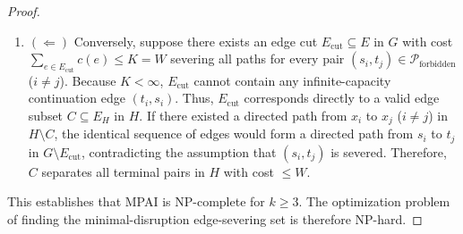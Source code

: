 \begin{proof}
\begin{enumerate}
    \item $(\Leftarrow)$ Conversely, suppose there exists an edge cut $E_{\text{cut}} \subseteq E$ in $G$ with cost $\sum_{e \in E_{\text{cut}}} c(e) \le K = W$ severing all paths for every pair $(s_i, t_j) \in \mathcal{P}_{\text{forbidden}}$ ($i \neq j$). Because $K < \infty$, $E_{\text{cut}}$ cannot contain any infinite-capacity continuation edge $(t_i, s_i)$. Thus, $E_{\text{cut}}$ corresponds directly to a valid edge subset $C \subseteq E_H$ in $H$. If there existed a directed path from $x_i$ to $x_j$ ($i \neq j$) in $H \setminus C$, the identical sequence of edges would form a directed path from $s_i$ to $t_j$ in $G \setminus E_{\text{cut}}$, contradicting the assumption that $(s_i, t_j)$ is severed. Therefore, $C$ separates all terminal pairs in $H$ with cost $\le W$.
\end{enumerate}

This establishes that MPAI is NP-complete for $k \ge 3$. The optimization problem of finding the minimal-disruption edge-severing set is therefore NP-hard.
\end{proof}
